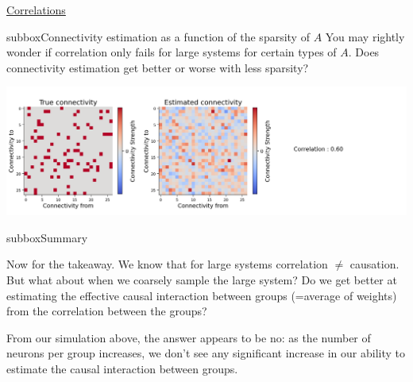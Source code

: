 \begin{textbox}{\href{https://compneuro.neuromatch.io/tutorials/W3D5_NetworkCausality/student/W3D5_Tutorial2.html}{Correlations }   }
\begin{subbox}{subbox}{Connectivity estimation as a function of the sparsity of $A$}
You may rightly wonder if correlation only fails for large systems for certain types of $A$. Does connectivity estimation get better or worse with less sparsity?

\begin{center}

\includegraphics[scale=0.15]{Figures/NC/NC_Figure12.png}
\end{center}
\end{subbox}

\begin{subbox}{subbox}{Summary}
\scriptsize


Now for the takeaway. We know that for large systems correlation $\not=$ causation. But what about when we coarsely sample the large system? Do we get better at estimating the effective causal interaction between groups (=average of weights) from the correlation between the groups?

From our simulation above, the answer appears to be no: as the number of neurons per group increases, we don't see any significant increase in our ability to estimate the causal interaction between groups.

\end{subbox}
\end{textbox}
\newpage
